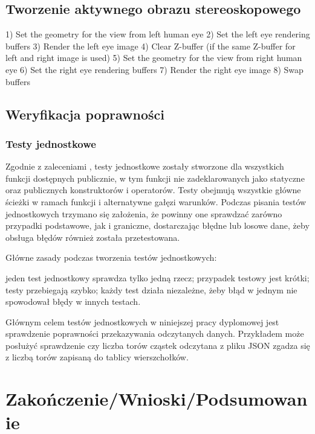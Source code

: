 \newpage
\subsection{Tworzenie aktywnego obrazu stereoskopowego} 
1) Set the geometry for the view from left human eye 
2) Set the left eye rendering buffers 
3) Render the left eye image 
4) Clear Z-buffer (if the same Z-buffer for left and right image is used) 
5) Set the geometry for the view from right human eye 
6) Set the right eye rendering buffers 
7) Render the right eye image 
8) Swap buffers
\subsection{Weryfikacja poprawności}
\subsubsection{Testy jednostkowe}
Zgodnie z zaleceniami \cite{cleanCode}, testy jednostkowe zostały stworzone dla wszystkich funkcji dostępnych publicznie, w tym funkcji nie zadeklarowanych jako statyczne oraz publicznych konstruktorów i operatorów. Testy obejmują wszystkie główne ścieżki w ramach funkcji i alternatywne gałęzi warunków. Podczas pisania testów jednostkowych trzymano się założenia, że powinny one sprawdzać zarówno przypadki podstawowe, jak i graniczne, dostarczając błędne lub losowe dane, żeby obsługa błędów również została przetestowana.

Główne zasady podczas tworzenia testów jednostkowych:
\begin{itemize}
\itemi jeden test jednostkowy sprawdza tylko jedną rzecz;
\itemi przypadek testowy jest krótki;
\itemi testy przebiegają szybko;
\itemi każdy test działa niezależne, żeby błąd w jednym nie spowodował błędy w innych testach.
\end{itemize}

Głównym celem testów jednostkowych w niniejszej pracy dyplomowej jest sprawdzenie poprawności przekazywania odczytanych danych. Przykładem może posłużyć sprawdzenie czy liczba torów cząstek odczytana z pliku JSON zgadza się z liczbą torów zapisaną do tablicy wierszchołków.


\newpage
\section[Zakończenie]{Zakończenie/Wnioski/Podsumowanie}
\newpage
\newpage
\listoffigures
\newpage
\listoftables


